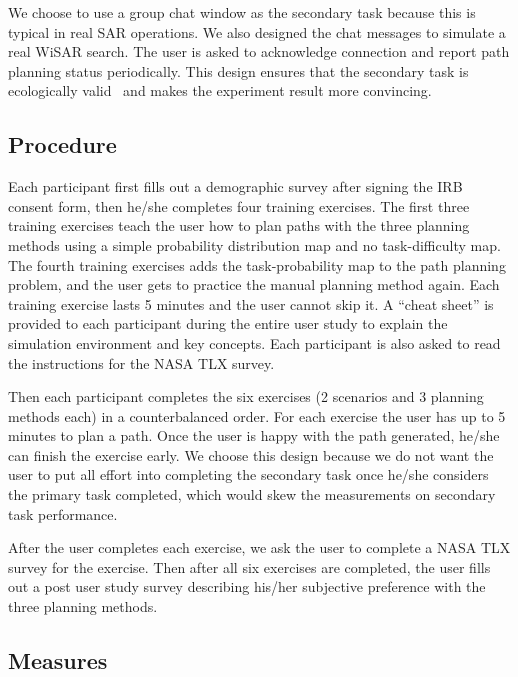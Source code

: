 \documentclass[journal]{IEEEtran}
\begin{document}
We choose to use a group chat window as the secondary task because this is typical in real SAR operations. We also designed the chat messages to simulate a real WiSAR search. The user is asked to acknowledge connection and report path planning status periodically. This design ensures that the secondary task is ecologically valid~\cite{Vicente1997Should,Rasmussen1994Cognitive} and makes the experiment result more convincing.

\subsection{Procedure}

Each participant first fills out a demographic survey after signing the IRB consent form, then he/she completes four training exercises. The first three training exercises teach the user how to plan paths with the three planning methods using a simple probability distribution map and no task-difficulty map. The fourth training exercises adds the task-probability map to the path planning problem, and the user gets to practice the manual planning method again. Each training exercise lasts 5 minutes and the user cannot skip it. A ``cheat sheet'' is provided to each participant during the entire user study to explain the simulation environment and key concepts. Each participant is also asked to read the instructions for the NASA TLX survey.

Then each participant completes the six exercises (2 scenarios and 3 planning methods each) in a counterbalanced order. For each exercise the user has up to 5 minutes to plan a path. Once the user is happy with the path generated, he/she can finish the exercise early. We choose this design because we do not want the user to put all effort into completing the secondary task once he/she considers the primary task completed, which would skew the measurements on secondary task performance.

After the user completes each exercise, we ask the user to complete a NASA TLX survey for the exercise. Then after all six exercises are completed, the user fills out a post user study survey describing his/her subjective preference with the three planning methods.

\subsection{Measures}
\end{document}
